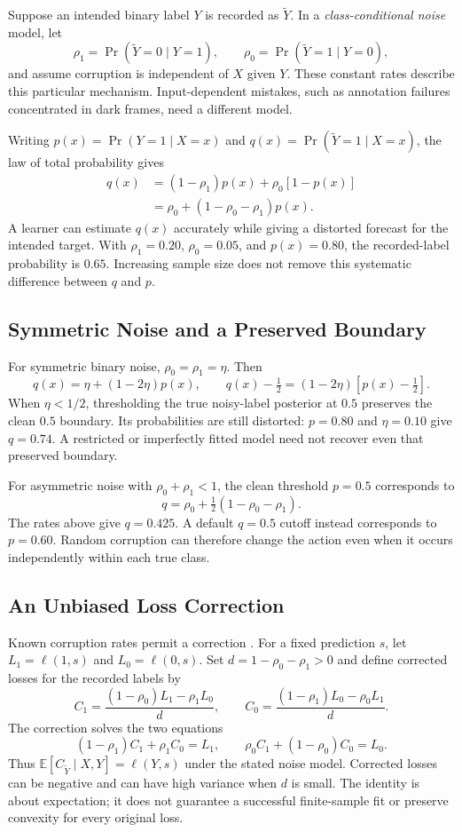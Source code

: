 Suppose an intended binary label $Y$ is recorded as $\tilde Y$. In a \emph{class-conditional noise} model, let
\[
\rho_1=\Pr(\tilde Y=0\mid Y=1),\qquad
\rho_0=\Pr(\tilde Y=1\mid Y=0),
\]
and assume corruption is independent of $X$ given $Y$. These constant rates describe this particular mechanism. Input-dependent mistakes, such as annotation failures concentrated in dark frames, need a different model.

Writing $p(x)=\Pr(Y=1\mid X=x)$ and $q(x)=\Pr(\tilde Y=1\mid X=x)$, the law of total probability gives
\begin{align*}
q(x)&=(1-\rho_1)p(x)+\rho_0[1-p(x)]\\
&=\rho_0+(1-\rho_0-\rho_1)p(x).
\end{align*}
A learner can estimate $q(x)$ accurately while giving a distorted forecast for the intended target. With $\rho_1=0.20$, $\rho_0=0.05$, and $p(x)=0.80$, the recorded-label probability is $0.65$. Increasing sample size does not remove this systematic difference between $q$ and $p$.

\subsection{Symmetric Noise and a Preserved Boundary}

For symmetric binary noise, $\rho_0=\rho_1=\eta$. Then
\[
q(x)=\eta+(1-2\eta)p(x),
\qquad q(x)-\tfrac12=(1-2\eta)[p(x)-\tfrac12].
\]
When $\eta<1/2$, thresholding the true noisy-label posterior at $0.5$ preserves the clean $0.5$ boundary. Its probabilities are still distorted: $p=0.80$ and $\eta=0.10$ give $q=0.74$. A restricted or imperfectly fitted model need not recover even that preserved boundary.

For asymmetric noise with $\rho_0+\rho_1<1$, the clean threshold $p=0.5$ corresponds to
\[
q=\rho_0+\tfrac12(1-\rho_0-\rho_1).
\]
The rates above give $q=0.425$. A default $q=0.5$ cutoff instead corresponds to $p=0.60$. Random corruption can therefore change the action even when it occurs independently within each true class.

\subsection{An Unbiased Loss Correction}

Known corruption rates permit a correction \citep{natarajan2013}. For a fixed prediction $s$, let $L_1=\ell(1,s)$ and $L_0=\ell(0,s)$. Set $d=1-\rho_0-\rho_1>0$ and define corrected losses for the recorded labels by
\[
C_1=\frac{(1-\rho_0)L_1-\rho_1L_0}{d},
\qquad
C_0=\frac{(1-\rho_1)L_0-\rho_0L_1}{d}.
\]
The correction solves the two equations
\[
(1-\rho_1)C_1+\rho_1C_0=L_1,
\qquad
\rho_0C_1+(1-\rho_0)C_0=L_0.
\]
Thus $\mathbb E[C_{\tilde Y}\mid X,Y]=\ell(Y,s)$ under the stated noise model. Corrected losses can be negative and can have high variance when $d$ is small. The identity is about expectation; it does not guarantee a successful finite-sample fit or preserve convexity for every original loss.

